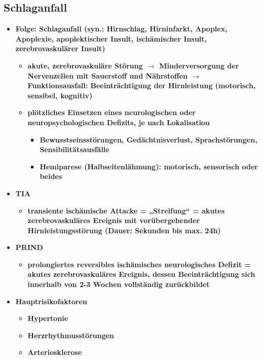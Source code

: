 \subsection{Schlaganfall}
	\begin{itemize}
		\item \textbf{Folge: Schlaganfall (syn.: Hirnschlag, Hirninfarkt, Apoplex, Apoplexie, apoplektischer Insult, ischämischer Insult, zerebrovaskulärer Insult)}
			\begin{itemize}
				\item \textbf{akute, zerebrovaskuläre Störung $\rightarrow$ Minderversorgung der Nervenzellen mit Sauerstoff und Nährstoffen $\rightarrow$ Funktionsausfall: Beeinträchtigung der Hirnleistung (motorisch, sensibel, kognitiv)}
				\item \textbf{plötzliches Einsetzen eines neurologischen oder neuropsychologischen Defizits, je nach Lokalisation}
					\begin{itemize}
						\item \textbf{Bewusstseinsstörungen, Gedächtnisverlust, Sprachstörungen, Sensibilitätsausfälle}
						\item \textbf{Hemiparese (Halbseitenlähmung): motorisch, sensorisch oder beides}
					\end{itemize}
			\end{itemize}
		\item \textbf{TIA}
			\begin{itemize}
				\item \textbf{transiente ischämische Attacke = „Streifung“ = akutes zerebrovaskuläres Ereignis mit vorübergehender Hirnleistungsstörung (Dauer: Sekunden bis max. 24h)}
			\end{itemize}
		\item \textbf{PRIND}
			\begin{itemize}
				\item \textbf{prolongiertes reversibles ischämisches neurologisches Defizit = akutes zerebrovaskuläres Ereignis, dessen Beeinträchtigung sich innerhalb von 2-3 Wochen vollständig zurückbildet}
			\end{itemize}
\pagebreak
		\item \textbf{Hauptrisikofaktoren}
			\begin{itemize}
				\item \textbf{Hypertonie}
				\item \textbf{Herzrhythmusstörungen}
				\item \textbf{Arteriosklerose}
			\end{itemize}

\end{itemize}
